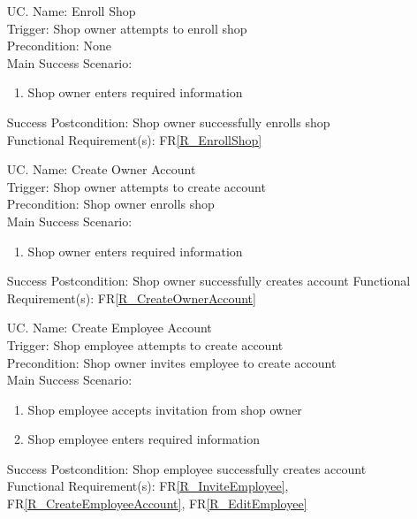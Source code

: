 \documentclass[12pt]{article}
\newcounter{ucnum} %
\begin{document}
\noindent \begin{itemize}

\item[UC\refstepcounter{ucnum}\theucnum \label{UC_EnrollShop}. ]
Name: Enroll Shop\\
Trigger: Shop owner attempts to enroll shop\\
Precondition: None\\
Main Success Scenario:
\begin{enumerate}
    \item Shop owner enters required information
\end{enumerate}
Success Postcondition: Shop owner successfully enrolls shop\\
Functional Requirement(s): FR\ref{R_EnrollShop}

\item[UC\refstepcounter{ucnum}\theucnum \label{UC_CreateOwnerAccount}. ]
Name: Create Owner Account\\
Trigger: Shop owner attempts to create account\\
Precondition: Shop owner enrolls shop\\
Main Success Scenario:
\begin{enumerate}
    \item Shop owner enters required information
\end{enumerate}
Success Postcondition: Shop owner successfully creates account
Functional Requirement(s): FR\ref{R_CreateOwnerAccount}

\item[UC\refstepcounter{ucnum}\theucnum \label{UC_CreateEmployeeAccount}. ]
Name: Create Employee Account\\
Trigger: Shop employee attempts to create account\\
Precondition: Shop owner invites employee to create account\\
Main Success Scenario:
\begin{enumerate}
    \item Shop employee accepts invitation from shop owner
    \item Shop employee enters required information
\end{enumerate}
Success Postcondition: Shop employee successfully creates account\\
Functional Requirement(s): FR\ref{R_InviteEmployee}, FR\ref{R_CreateEmployeeAccount}, FR\ref{R_EditEmployee}


\end{itemize}
\end{document}
